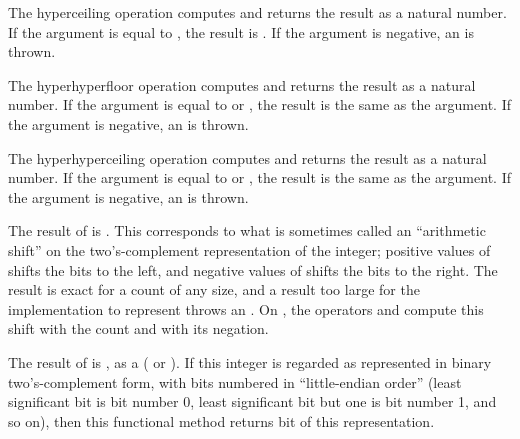 The hyperceiling operation  computes 
and returns the result as a natural number.
If the argument is equal to , the result is .
If the argument is negative, an  is thrown.

The hyperhyperfloor operation  computes 
and returns the result as a natural number.
If the argument is equal to  or , the result is the same as the argument.
If the argument is negative, an  is thrown.

The hyperhyperceiling operation  computes 
and returns the result as a natural number.
If the argument is equal to  or , the result is the same as the argument.
If the argument is negative, an  is thrown.



The result of  is .
This corresponds to what is sometimes called an ``arithmetic shift''
on the two's-complement representation of the integer;
positive values of  shifts the bits to the left,
and negative values of  shifts the bits to the right.
The result is exact for a count of any size, and a result too large for the
implementation to represent throws an .
On , the operators  and  compute this
shift with the count and with its negation.



The result of  is , as a  ( or ).
If this integer is regarded as represented in binary two's-complement form,
with bits numbered in ``little-endian order'' (least significant bit is bit number 0,
least significant bit but one is bit number 1, and so on), then this functional
method returns bit  of this representation.



